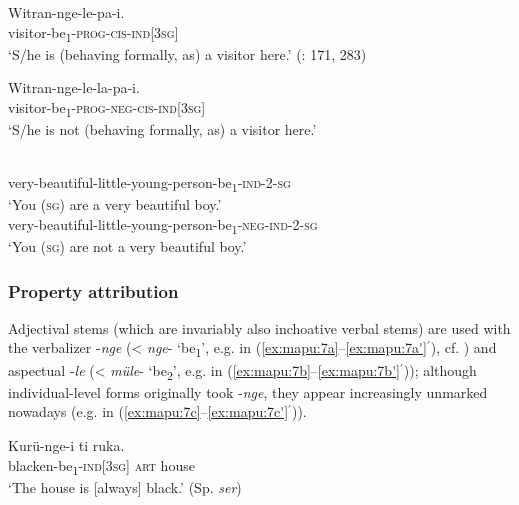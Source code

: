 \documentclass[output=paper,colorlinks,citecolor=brown,draft]{langscibook}
\begin{document}
    \ex\label{ex:mapu:5c}
        \gll Witran-nge-le{}-pa-i.\\
             visitor-be\textsubscript{1}{}-\textsc{prog{}-cis-ind[3sg]}\\
        \glt ‘S/he is (behaving formally, as) a visitor here.’ (\citealt{Smeets2008}: 171, 283)

    \ex\label{ex:mapu:5d}
        \gll Witran-nge-le-la-pa-i.\\
             visitor-be\textsubscript{1}{}-\textsc{prog-neg-cis-ind[3sg]}\\
        \glt ‘S/he is not (behaving formally, as) a visitor here.’
    \z
\z 


\ea\label{ex:mapu:6}
    
    \ea\label{ex:mapu:6a}
         \\ 
             very-beautiful-little-young-person-be\textsubscript{1}{}-\textsc{ind-2-sg}\\
        \glt ‘You (\textsc{sg}) are a very beautiful boy.’
    \ex\label{ex:mapu:6b}
         \\
             very-beautiful-little-young-person-be\textsubscript{1}{}-\textsc{neg-ind-2-sg}\\
        \glt ‘You (\textsc{sg}) are not a very beautiful boy.’ \citep[54]{Moesbach1962}
    \z
\z 
 
\subsubsection{Property attribution}

Adjectival stems (which are invariably also inchoative verbal stems) are used with the verbalizer \nobreakdash-\textit{nge} (< \textit{nge}{}- ‘be\textsubscript{1}’, e.g. in
(\ref{ex:mapu:7a}--\ref{ex:mapu:7a'}{\small $^{'}$}), cf. ) and aspectual \nobreakdash-\textit{le} (< \textit{müle}{}- ‘be\textsubscript{2}’, e.g. in
(\ref{ex:mapu:7b}--\ref{ex:mapu:7b'}{\small $^{'}$}));
although individual-level forms originally took \nobreakdash-\textit{nge}, they appear increasingly unmarked nowadays
(e.g. in (\ref{ex:mapu:7c}--\ref{ex:mapu:7c'}{\small $^{'}$})).


\ea\label{ex:mapu:7}
    \ea\label{ex:mapu:7a}
        \gll  Kurü-nge-i ti ruka.\\ 
              blacken-be\textsubscript{1}\textsc{{}-ind[3sg] art} house\\
        \glt ‘The house is [always] black.’ (Sp. \textit{ser})
    
\end{document}
